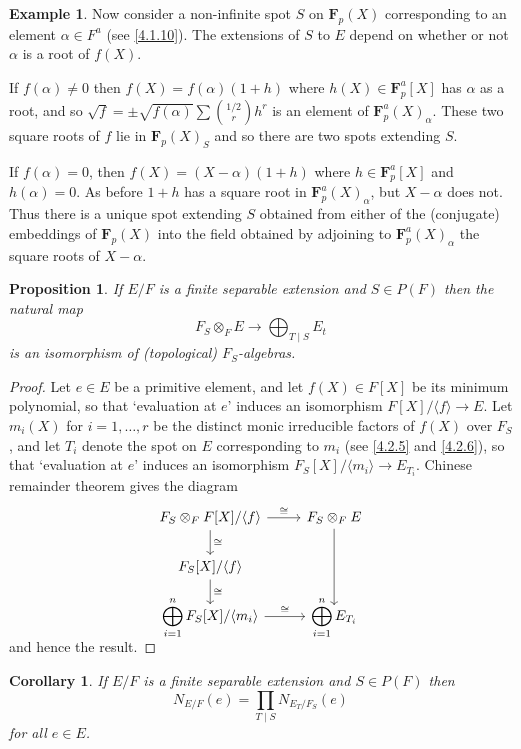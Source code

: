 \documentclass[10pt]{article}
\newtheorem{prop}[theo]{Proposition}
\newtheorem{coro}[theo]{Corollary}
\theoremstyle{definition}
\newtheorem{exam}[theo]{Example}
\def\<{\langle}
\def\>{\rangle}
\def\FF{\mathbf{F}}
\def\qw#1{`#1'}
\begin{document}
\begin{exam}
Now consider a non-infinite spot $S$ on $\FF_p(X)$ corresponding to an element $\alpha \in F^a$ (see \ref{4.1.10}).
The extensions of $S$ to $E$ depend on whether or not $\alpha$ is a root of $f(X)$.

If $f(\alpha) \not= 0$ then $f(X) = f(\alpha)(1+h)$ where $h(X) \in \FF_p^a[X]$ has $\alpha$ as a root, and so $\sqrt f = \pm \sqrt{f(\alpha)} \sum \binom{1/2}{r} h^r$ is an element of $\FF_p^a(X)_\alpha$.
These two square roots of $f$ lie in $\FF_p(X)_S$ and so there are two spots extending $S$.

If $f(\alpha) = 0$, then $f(X) = (X-\alpha)(1+h)$ where $h \in \FF_p^a[X]$ and $h(\alpha) = 0$.
As before $1+h$ has a square root in $\FF_p^a(X)_\alpha$, but $X-\alpha$ does not.
Thus there is a unique spot extending $S$ obtained from either of the (conjugate) embeddings of $\FF_p(X)$ into the field obtained by adjoining to $\FF_p^a(X)_\alpha$ the square roots of $X-\alpha$.
\end{exam}


\begin{prop}
\label{4.2.9}
If $E/F$ is a finite separable extension and $S \in P(F)$ then the natural map
\[
F_S \otimes_F E \to \bigoplus_{T \mid S} E_t
\]
is an isomorphism of (topological) $F_S$-algebras.
\end{prop}

\begin{proof}
Let $e \in E$ be a primitive element, and let $f(X) \in F[X]$ be its minimum polynomial, so that \qw{evaluation at $e$} induces an isomorphism $F[X] / \<f\> \to E$.
Let $m_i(X)$ for $i=1,\ldots,r$ be the distinct monic irreducible factors of $f(X)$ over $F_S$, and let $T_i$ denote the spot on $E$ corresponding to $m_i$ (see \ref{4.2.5} and \ref{4.2.6}), so that \qw{evaluation at $e$} induces an isomorphism $F_S[X]/\< m_i \> \to E_{T_i}$.
Chinese remainder theorem gives the diagram
\[
\begin{tikzcd}
F_S \otimes_F F[X]/\<f\> \ar[r,"\cong"] \ar[d,"\cong"] &
F_S \otimes_F E \ar[dd] 
\\
F_S[X] / \<f\> \ar[d,"\cong"] &
\\
\smash{\displaystyle\bigoplus_{i=1}^n F_S[X]} / \<m_i\> \ar[r, "\cong"] &
\smash{\displaystyle\bigoplus_{i=1}^n} \, E_{T_i}
\end{tikzcd}
\]
and hence the result.
\end{proof}


\begin{coro}
\label{4.2.10}
If $E/F$ is a finite separable extension and $S \in P(F)$ then
\[
N_{E/F}(e)
= \prod_{T \mid S} N_{E_T/F_S}(e)
\]
for all $e \in E$.
\end{coro}
\end{document}
